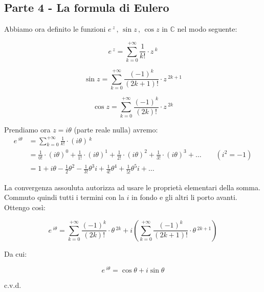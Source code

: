 \documentclass[../dimostrazioni]{subfiles}
\begin{document}
            \subsection*{Parte 4 - \textbf{La formula di Eulero}}

                Abbiamo ora definito le funzioni \(e\,^z \,,\, \sin z \, ,\, \cos z\) in \(\mathbb{C}\) nel modo seguente:

                \[  e\,^z  =  \sum_{k=0}^{+\infty} \frac{1}{k!} \cdot z\,^k    \]

                \[  \sin z = \sum_{k=0}^{+\infty} \frac{(-1)^k}{(2k+1)!} \cdot z\,^{2k+1} \]

                \[  \cos z = \sum_{k=0}^{+\infty} \frac{(-1)^k}{(2k)!} \cdot z\,^{2k}    \]

                Prendiamo ora \( z = i\theta \) (parte reale nulla) avremo:
                \begin{align*}
                    e\,^{i\theta}  &=  \sum_{k=0}^{+\infty} \frac{1}{k!} \cdot (i\theta)\,^k \\
                    &= \frac{1}{0!} \cdot (i\theta)^0 + \frac{1}{1!} \cdot (i\theta)^1 + \frac{1}{2!} \cdot (i\theta)^2 +  \frac{1}{3!} \cdot (i\theta)^3 + \dots  \qquad (i^2 = -1)\\
                    &= 1 + i\theta - \frac{1}{2}\theta^2 - \frac{1}{3!}\theta^3i + \frac{1}{4!}\theta^4 + \frac{1}{5!}\theta^5i + \dots
                \end{align*}
                
                La convergenza assouluta autorizza ad usare le proprietà elementari della somma. 
                Commuto quindi tutti i termini con la \(i\) in fondo e gli altri li porto avanti. Ottengo così:

                \[  e\,^{i\theta} =\sum_{k=0}^{+\infty} \frac{(-1)^k}{(2k)!} \cdot \theta\,^{2k} + i\left(\sum_{k=0}^{+\infty} \frac{(-1)^k}{(2k+1)!} \cdot \theta\,^{2k+1}  \right)\]

                Da cui:

                \[ e\,^{i\theta} = \cos \theta + i \sin \theta \]

                c.v.d.
\end{document}
